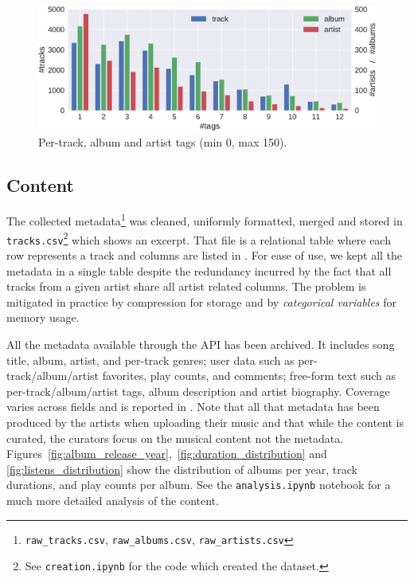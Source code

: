 \documentclass{article}
\begin{document}
\begin{figure}
	\centering
	\includegraphics[width=\linewidth]{tag_distribution.pdf}
	\caption{Per-track, album and artist tags (min 0, max 150).}
	\label{fig:tag_distribution}
\end{figure}

\subsection{Content}

The collected metadata\footnote{\texttt{raw\_tracks.csv}, \texttt{raw\_albums.csv}, \texttt{raw\_artists.csv}} was cleaned, uniformly formatted, merged and stored in \texttt{tracks.csv}\footnote{\label{creation}See \texttt{creation.ipynb} for the code which created the dataset.} which  shows an excerpt. That file is a relational table where each row represents a track and columns are listed in .
For ease of use, we kept all the metadata in a single table despite the redundancy incurred by the fact that all tracks from a given artist share all artist related columns. The problem is mitigated in practice by compression for storage and by \textit{categorical variables} for memory usage.

All the metadata available through the API has been archived. It includes song title, album, artist, and per-track genres; user data such as per-track/album/artist favorites, play counts, and comments; free-form text such as per-track/album/artist tags, album description and artist biography. 
Coverage varies across fields and is reported in .
Note that all that metadata has been produced by the artists when uploading their music and that while the content is curated, the curators focus on the musical content not the metadata.
Figures~\ref{fig:album_release_year},~\ref{fig:duration_distribution} and \ref{fig:listens_distribution} show the distribution of albums per year, track durations, and play counts per album.
See the \texttt{analysis.ipynb} notebook for a much more detailed analysis of the content.
\end{document}
